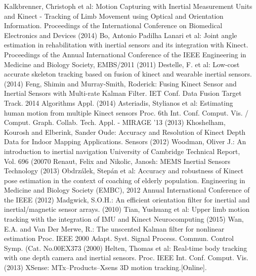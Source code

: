 \documentclass[9pt]{llncs}
\begin{document}
\begin{thebibliography}{9}
	Kalkbrenner, Christoph et al:
	Motion Capturing with Inertial Measurement Units and Kinect - Tracking of Limb Movement using Optical and Orientation Information.
	Proceedings of the International Conference on Biomedical Electronics and Devices (2014)
	Bo, Antonio Padilha Lanari et al:
	Joint angle estimation in rehabilitation with inertial sensors and its integration with Kinect.
	Proceedings of the Annual International Conference of the IEEE Engineering in Medicine and Biology Society, EMBS/2011 (2011)
	Destelle, F. et al: 
	Low-cost accurate skeleton tracking based on fusion of kinect and wearable inertial sensors.(2014)
	Feng, Shimin and Murray-Smith, Roderick:
	Fusing Kinect Sensor and Inertial Sensors with Multi-rate Kalman Filter.
	IET Conf. Data Fusion Target Track. 2014 Algorithms Appl. (2014)
	Asteriadis, Stylianos et al:
	Estimating human motion from multiple Kinect sensors
	Proc. 6th Int. Conf. Comput. Vis. / Comput. Graph. Collab. Tech. Appl. - MIRAGE '13 (2013)
	Khoshelham, Kourosh and Elberink, Sander Oude:
	Accuracy and Resolution of Kinect Depth Data for Indoor Mapping Applications.
	Sensors (2012)
	Woodman, Oliver J.:
	An introduction to inertial navigation
	University of Cambridge Technical Report, Vol. 696 (20070
	Renaut, Felix and Nikolic, Janosh:
	MEMS Inertial Sensors Technology (2013)
	Obdrz{\'{a}}lek, Step{\'{a}}n et al:
	Accuracy and robustness of Kinect pose estimation in the context of coaching of elderly population.
	Engineering in Medicine and Biology Society (EMBC), 2012 Annual International Conference of the IEEE (2012)
	Madgwick, S.O.H.:
	An efficient orientation filter for inertial and inertial/magnetic sensor arrays. (2010)
	Tian, Yushuang et al:
	Upper limb motion tracking with the integration of IMU and Kinect
	Neurocomputing (2015)
	Wan, E.A. and {Van Der Merwe}, R.:
	The unscented Kalman filter for nonlinear estimation
	Proc. IEEE 2000 Adapt. Syst. Signal Process. Commun. Control Symp. (Cat. No.00EX373 (2000)
	Helten, Thomas et al:
	Real-time body tracking with one depth camera and inertial sensors.
	Proc. IEEE Int. Conf. Comput. Vis. (2013)
	XSense:
	MTx--Products--Xsens 3D motion tracking.[Online]. 

\end{thebibliography}
\end{document}
